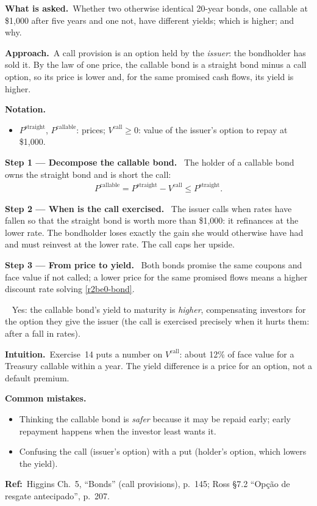 \documentclass[11pt,a4paper]{article}
\newcommand{\notation}{\par\noindent\textbf{Notation.}}
\newcommand{\step}[2]{\par\medskip\noindent\textbf{Step #1 --- #2.}~}
\newcommand{\intuition}{\par\medskip\noindent\textbf{Intuition.}~}
\newcommand{\refbib}{\par\smallskip\noindent\textbf{Ref:}~}
\newcommand{\asked}{\par\medskip\noindent\textbf{What is asked.}~}
\newcommand{\approach}{\par\smallskip\noindent\textbf{Approach.}~}
\newcommand{\answer}[1]{\par\smallskip\noindent\fbox{\textbf{Answer #1.}}~}
\newcommand{\pitfalls}{\par\medskip\noindent\textbf{Common mistakes.}}
\begin{document}
\asked Whether two otherwise identical 20-year bonds, one callable at \$1,000 after five years and one not,
have different yields; which is higher; and why.

\approach A call provision is an option held by the \emph{issuer}: the bondholder has sold it. By the law of
one price, the callable bond is a straight bond minus a call option, so its price is lower and, for the same
promised cash flows, its yield is higher.

\notation
\begin{itemize}
  \item $P^{\text{straight}}$, $P^{\text{callable}}$: prices; $V^{\text{call}}\ge 0$: value of the issuer's option to repay at \$1,000.
\end{itemize}

\step{1}{Decompose the callable bond} The holder of a callable bond owns the straight bond and is short the call:
\begin{align}
  P^{\text{callable}} = P^{\text{straight}} - V^{\text{call}} \le P^{\text{straight}}. \label{r2be4-dec}
\end{align}

\step{2}{When is the call exercised} The issuer calls when rates have fallen so that the straight bond is worth
more than \$1,000: it refinances at the lower rate. The bondholder loses exactly the gain she would otherwise
have had and must reinvest at the lower rate. The call caps her upside.

\step{3}{From price to yield} Both bonds promise the same coupons and face value if not called; a lower price for the
same promised flows means a higher discount rate solving \eqref{r2be0-bond}.
\answer{\unskip} Yes: the callable bond's yield to maturity is \emph{higher}, compensating investors for the option they give
the issuer (the call is exercised precisely when it hurts them: after a fall in rates).

\intuition Exercise~14 puts a number on $V^{\text{call}}$: about 12\% of face value for a Treasury callable within a year.
The yield difference is a price for an option, not a default premium.
\pitfalls
\begin{itemize}
  \item Thinking the callable bond is \emph{safer} because it may be repaid early; early repayment happens when the investor least wants it.
  \item Confusing the call (issuer's option) with a put (holder's option, which lowers the yield).
\end{itemize}
\refbib{Higgins Ch.~5, ``Bonds'' (call provisions), p.~145; Ross \S7.2 ``Op\c{c}\~ao de resgate antecipado'', p.~207.}
\end{document}
